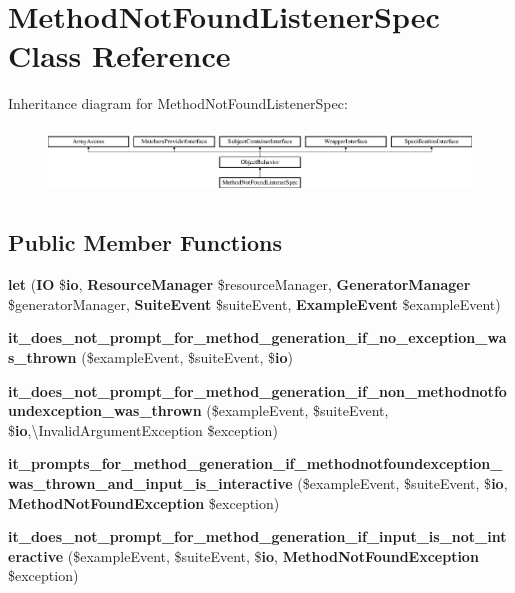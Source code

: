 \section{Method\+Not\+Found\+Listener\+Spec Class Reference}
\label{classspec_1_1_php_spec_1_1_listener_1_1_method_not_found_listener_spec}
Inheritance diagram for Method\+Not\+Found\+Listener\+Spec\+:\begin{figure}[H]
\begin{center}
\leavevmode
\includegraphics[height=1.759162cm]{classspec_1_1_php_spec_1_1_listener_1_1_method_not_found_listener_spec}
\end{center}
\end{figure}
\subsection*{Public Member Functions}
\begin{DoxyCompactItemize}
\item 
{\bf let} ({\bf I\+O} \${\bf io}, {\bf Resource\+Manager} \$resource\+Manager, {\bf Generator\+Manager} \$generator\+Manager, {\bf Suite\+Event} \$suite\+Event, {\bf Example\+Event} \$example\+Event)
\item 
{\bf it\+\_\+does\+\_\+not\+\_\+prompt\+\_\+for\+\_\+method\+\_\+generation\+\_\+if\+\_\+no\+\_\+exception\+\_\+was\+\_\+thrown} (\$example\+Event, \$suite\+Event, \${\bf io})
\item 
{\bf it\+\_\+does\+\_\+not\+\_\+prompt\+\_\+for\+\_\+method\+\_\+generation\+\_\+if\+\_\+non\+\_\+methodnotfoundexception\+\_\+was\+\_\+thrown} (\$example\+Event, \$suite\+Event, \${\bf io},\textbackslash{}Invalid\+Argument\+Exception \$exception)
\item 
{\bf it\+\_\+prompts\+\_\+for\+\_\+method\+\_\+generation\+\_\+if\+\_\+methodnotfoundexception\+\_\+was\+\_\+thrown\+\_\+and\+\_\+input\+\_\+is\+\_\+interactive} (\$example\+Event, \$suite\+Event, \${\bf io}, {\bf Method\+Not\+Found\+Exception} \$exception)
\item 
{\bf it\+\_\+does\+\_\+not\+\_\+prompt\+\_\+for\+\_\+method\+\_\+generation\+\_\+if\+\_\+input\+\_\+is\+\_\+not\+\_\+interactive} (\$example\+Event, \$suite\+Event, \${\bf io}, {\bf Method\+Not\+Found\+Exception} \$exception)
\end{DoxyCompactItemize}
